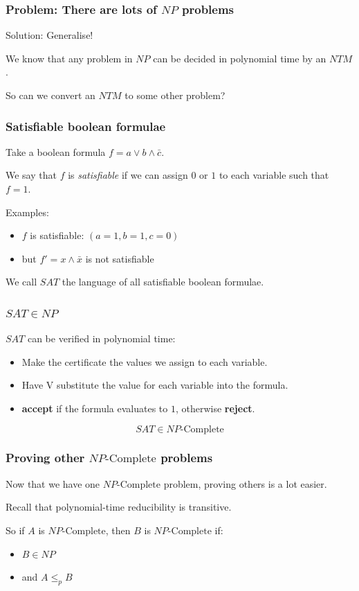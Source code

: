 \documentclass[aspectratio=169]{beamer}
\begin{document}
\begin{frame}
\frametitle{Problem: There are lots of $NP$ problems}
Solution: Generalise!

We know that any problem in $NP$ can be decided in polynomial time by an $NTM$.

So can we convert an $NTM$ to some other problem?
\end{frame}

\begin{frame}
\frametitle{Satisfiable boolean formulae}
Take a boolean formula $f = a \vee b \wedge \bar{c}$.

We say that $f$ is {\em satisfiable} if we can assign $0$ or $1$ to each variable such that $f = 1$.

Examples:
\begin{itemize}
	\item $f$ is satisfiable: $(a = 1, b = 1, c = 0)$
	\item but $f' = x \wedge \bar{x}$ is not satisfiable
\end{itemize}

We call $SAT$ the language of all satisfiable boolean formulae.
\end{frame}

\begin{frame}
\frametitle{$SAT \in NP$}
$SAT$ can be verified in polynomial time:

\begin{itemize}
	\item Make the certificate the values we assign to each variable.
	\item Have V substitute the value for each variable into the formula.
	\item {\bf accept} if the formula evaluates to $1$, otherwise {\bf reject}.
\end{itemize}
\end{frame}

\begin{frame}
$$SAT \in NP\text{-Complete}$$
\end{frame}

\begin{frame}
\frametitle{Proving other $NP\text{-Complete}$ problems}

Now that we have one $NP\text{-Complete}$ problem, proving others is a lot easier.

Recall that polynomial-time reducibility is transitive.

So if $A$ is $NP\text{-Complete}$, then $B$ is $NP\text{-Complete}$ if:

\begin{itemize}
	\item $B \in NP$
	\item and $A \leq_p B$
\end{itemize}
\end{frame}
\end{document}
